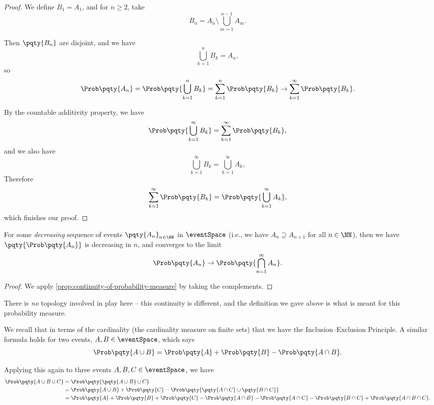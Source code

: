 \begin{proof}
    We define \(B_1 = A_1\), and for \(n \geq 2\), take
    \[
        B_n = A_n \setminus \bigcup_{m = 1}^{n - 1} A_m.
    \]

    Then \(\pqty{B_n}\) are disjoint, and we have
    \[
        \bigcup_{k = 1}^{n} B_k = A_n,
    \]
    so
    \[
        \Prob\pqty{A_n} = \Prob\pqty{\bigcup_{k = 1}^{n} B_k} = \sum_{k = 1}^{n} \Prob\pqty{B_k} \to \sum_{k = 1}^{\infty} \Prob\pqty{B_k}.
    \]

    By the countable additivity property, we have
    \[
        \Prob\pqty{\bigcup_{k = 1}^{\infty} B_k} = \sum_{k = 1}^{\infty} \Prob\pqty{B_k},
    \]
    and we also have
    \[
        \bigcup_{k = 1}^{\infty} B_k = \bigcup_{k = 1}^{\infty} A_k,
    \]
    Therefore
    \[
        \sum_{k = 1}^{\infty} \Prob\pqty{B_k} = \Prob\pqty{\bigcup_{k = 1}^{\infty} A_k},
    \]
    which finishes our proof.
\end{proof}

\begin{corollary}
    \label{cor:continuity-probability-measure-decreasing-sequence}%
     For some \emph{decreasing} sequence of events \(\pqty{A_n}_{n \in \NN}\) in \(\eventSpace\) (i.e., we have \(A_n \supseteq A_{n + 1}\) for all \(n \in \NN\)), then we have \(\pqty{\Prob\pqty{A_n}}\) is decreasing in \(n\), and converges to the limit
    \[
        \Prob\pqty{A_n} \to \Prob\pqty{\bigcap_{n = 1}^{\infty} A_n}.
    \]
\end{corollary}

\begin{proof}
    We apply \autoref{prop:continuity-of-probability-measure} by taking the complements.
\end{proof}

\begin{remark}
    There is \emph{no} topology involved in play here -- this continuity is different, and the definition we gave above is what is meant for this probability measure.
\end{remark}

We recall that in terms of the cardinality (the cardinality measure on finite sets) that we have the Inclusion--Exclusion Principle. A similar formula holds for two events, \(A, B \in \eventSpace\), which says
\[
    \Prob\pqty{A \cup B} = \Prob\pqty{A} + \Prob\pqty{B} - \Prob\pqty{A \cap B}.
\]

Applying this again to three events \(A, B, C \in \eventSpace\), we have
\begin{align*}
    \Prob\pqty{A \cup B \cup C} &=  \Prob\pqty{\pqty{A \cup B} \cup C}\\
    &= \Prob\pqty{A \cup B} + \Prob\pqty{C} - \Prob\pqty{\pqty{A \cap C} \cup \pqty{B \cap C}} \\
    &= \Prob\pqty{A} + \Prob\pqty{B} + \Prob\pqty{C} - \Prob\pqty{A \cap B} - \Prob\pqty{A \cap C} - \Prob\pqty{B \cap C} + \Prob\pqty{A \cap B \cap C}.
\end{align*}

